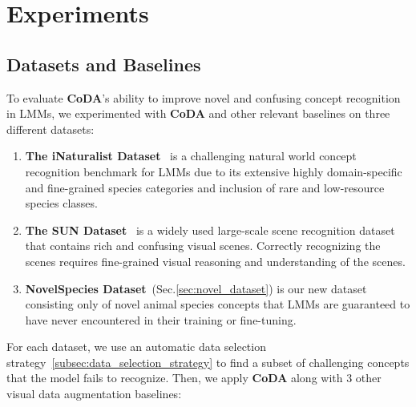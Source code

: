 \section{Experiments}
\label{sec:experiment}






\subsection{Datasets and Baselines}

To evaluate \textbf{CoDA}'s ability to improve novel and confusing concept recognition in LMMs, we experimented with \textbf{CoDA} and other relevant baselines on three different datasets:

\begin{enumerate}[topsep=0pt, itemsep=0em]
    \item \textbf{The iNaturalist Dataset}~\cite{van2018inaturalist} is a challenging natural world concept recognition benchmark for LMMs due to its extensive highly domain-specific and fine-grained species categories and inclusion of rare and low-resource species classes.
    
    \item \textbf{The SUN Dataset}~\cite{xiao2010sun} is a widely used large-scale scene recognition dataset that contains rich and confusing visual scenes. Correctly recognizing the scenes requires fine-grained visual reasoning and understanding of the scenes.
    
    \item \textbf{NovelSpecies Dataset}~(Sec.\ref{sec:novel_dataset}) is our new dataset consisting only of novel animal species concepts that LMMs are guaranteed to have never encountered in their training or fine-tuning.
\end{enumerate}

For each dataset, we use an automatic data selection strategy~\ref{subsec:data_selection_strategy} to find a subset of challenging concepts that the model fails to recognize. Then, we apply \textbf{CoDA} along with 3 other visual data augmentation baselines:

